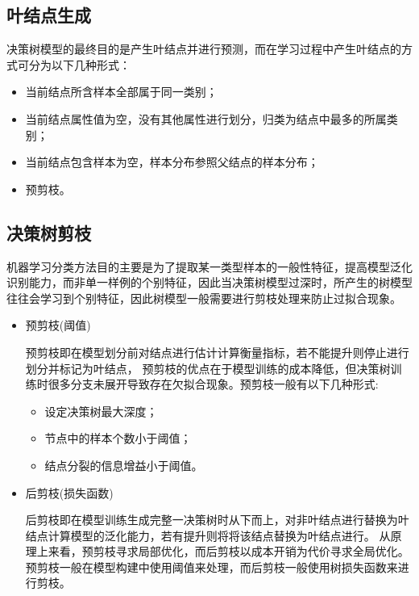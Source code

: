 \documentclass[a4paper]{article}
\begin{document}
	\subsection{叶结点生成}
	决策树模型的最终目的是产生叶结点并进行预测，而在学习过程中产生叶结点的方式可分为以下几种形式：
	\begin{itemize}
	  	\item 	当前结点所含样本全部属于同一类别；
	  	\item 	当前结点属性值为空，没有其他属性进行划分，归类为结点中最多的所属类别；
	  	\item 	当前结点包含样本为空，样本分布参照父结点的样本分布；
	  	\item 	预剪枝。
	\end{itemize}
	\subsection{决策树剪枝}
	机器学习分类方法目的主要是为了提取某一类型样本的一般性特征，提高模型泛化识别能力，而非单一样例的个别特征，因此当决策树模型过深时，所产生的树模型往往会学习到个别特征，因此树模型一般需要进行剪枝处理来防止过拟合现象。
	\begin{itemize}
		\item 	预剪枝(阈值)\par
				预剪枝即在模型划分前对结点进行估计计算衡量指标，若不能提升则停止进行划分并标记为叶结点，
				预剪枝的优点在于模型训练的成本降低，但决策树训练时很多分支未展开导致存在欠拟合现象。预剪枝一般有以下几种形式:
				\begin{itemize}
					\item 	设定决策树最大深度；
					\item 	节点中的样本个数小于阈值；
					\item 	结点分裂的信息增益小于阈值。
				\end{itemize}
		\item 	后剪枝(损失函数)\par
				后剪枝即在模型训练生成完整一决策树时从下而上，对非叶结点进行替换为叶结点计算模型的泛化能力，若有提升则将将该结点替换为叶结点进行。
				从原理上来看，预剪枝寻求局部优化，而后剪枝以成本开销为代价寻求全局优化。预剪枝一般在模型构建中使用阈值来处理，而后剪枝一般使用树损失函数来进行剪枝。	
	\end{itemize}
\end{document}
